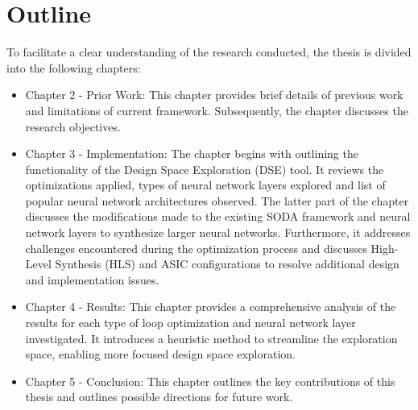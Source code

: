 \section{Outline}

To facilitate a clear understanding of the research conducted, the thesis is divided into the following chapters:

\begin{itemize}
    
    \item Chapter 2 - Prior Work: This chapter provides brief details of previous work and limitations of current framework. Subsequently, the chapter discusses the research objectives.

    \item Chapter 3 - Implementation: The chapter begins with outlining the functionality of the Design Space Exploration (DSE) tool. It reviews the optimizations applied, types of neural network layers explored and list of popular neural network architectures observed. The latter part of the chapter discusses the modifications made to the existing SODA framework and neural network layers to synthesize larger neural networks. Furthermore, it addresses challenges encountered during the optimization process and discusses High-Level Synthesis (HLS) and ASIC configurations to resolve additional design and implementation issues.

    \item Chapter 4 - Results: This chapter provides a comprehensive analysis of the results for each type of loop optimization and neural network layer investigated. It introduces a heuristic method to streamline the exploration space, enabling more focused design space exploration.

    \item Chapter 5 - Conclusion: This chapter outlines the key contributions of this thesis and outlines possible directions for future work.
    
\end{itemize}
